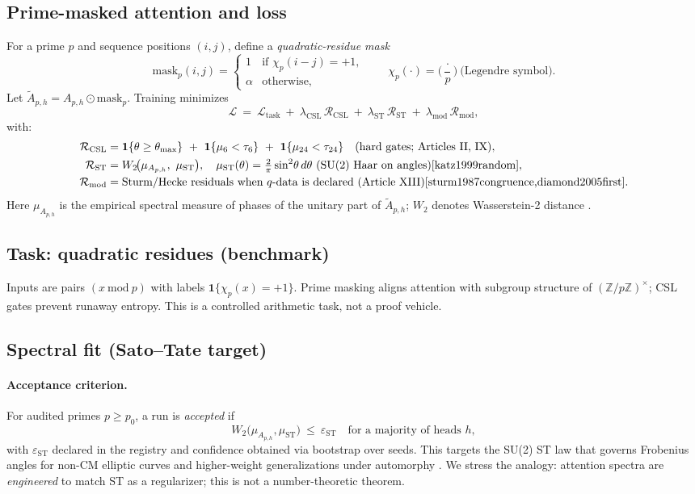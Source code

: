 \documentclass[12pt]{amsart}
\theoremstyle{plain}
\begin{document}
\subsection{Prime-masked attention and loss}
For a prime $p$ and sequence positions $(i,j)$, define a \emph{quadratic-residue mask}
\[
\mathrm{mask}_p(i,j)=
\begin{cases}
1 & \text{if } \chi_p(i-j)=+1,\\
\alpha & \text{otherwise},
\end{cases}
\qquad \chi_p(\cdot)=\Big(\frac{\cdot}{p}\Big)\ \text{(Legendre symbol)}.
\]
Let $\widetilde{A}_{p,h}=A_{p,h}\odot \mathrm{mask}_p$. Training minimizes
\[
\mathcal{L}\ =\ \mathcal{L}_{\mathrm{task}}\ +\ \lambda_{\mathrm{CSL}}\,\mathcal{R}_{\mathrm{CSL}}\ +\ \lambda_{\mathrm{ST}}\,\mathcal{R}_{\mathrm{ST}}\ +\ \lambda_{\mathrm{mod}}\,\mathcal{R}_{\mathrm{mod}},
\]
with:
\begin{align*}
\mathcal{R}_{\mathrm{CSL}}&=\mathbf{1}\{\theta\ge\theta_{\max}\}\ +\ \mathbf{1}\{\mu_6<\tau_6\}\ +\ \mathbf{1}\{\mu_{24}<\tau_{24}\}\quad\text{(hard gates; Articles II, IX)},\\
\mathcal{R}_{\mathrm{ST}}&=W_2\!\big(\mu_{A_{p,h}},\ \mu_{\mathrm{ST}}\big),\quad \mu_{\mathrm{ST}}(\theta)=\tfrac{2}{\pi}\sin^2\!\theta\,d\theta\ \text{(SU(2) Haar on angles)} \cite{katz1999random},\\
\mathcal{R}_{\mathrm{mod}}&=\text{Sturm/Hecke residuals when $q$-data is declared (Article XIII)} \cite{sturm1987congruence,diamond2005first}.
\end{align*}
Here $\mu_{A_{p,h}}$ is the empirical spectral measure of phases of the unitary part of $\widetilde{A}_{p,h}$; $W_2$ denotes Wasserstein-2 distance \cite{villani2009optimal}.

\subsection{Task: quadratic residues (benchmark)}
Inputs are pairs $(x\ \mathrm{mod}\ p)$ with labels $\mathbf{1}\{\chi_p(x)=+1\}$. Prime masking aligns attention with subgroup structure of $(\mathbb{Z}/p\mathbb{Z})^\times$; CSL gates prevent runaway entropy. This is a controlled arithmetic task, not a proof vehicle.

\subsection{Spectral fit (Sato–Tate target)}
\paragraph{Acceptance criterion.} For audited primes $p\ge p_0$, a run is \emph{accepted} if
\[
W_2\!\big(\mu_{A_{p,h}},\mu_{\mathrm{ST}}\big)\ \le\ \varepsilon_{\mathrm{ST}}
\quad\text{for a majority of heads }h,
\]
with $\varepsilon_{\mathrm{ST}}$ declared in the registry and confidence obtained via bootstrap over seeds. This targets the SU(2) ST law that governs Frobenius angles for non-CM elliptic curves and higher-weight generalizations under automorphy \cite{clozel2008satotate,barnet2011st}. We stress the analogy: attention spectra are \emph{engineered} to match ST as a regularizer; this is not a number-theoretic theorem.
\end{document}
